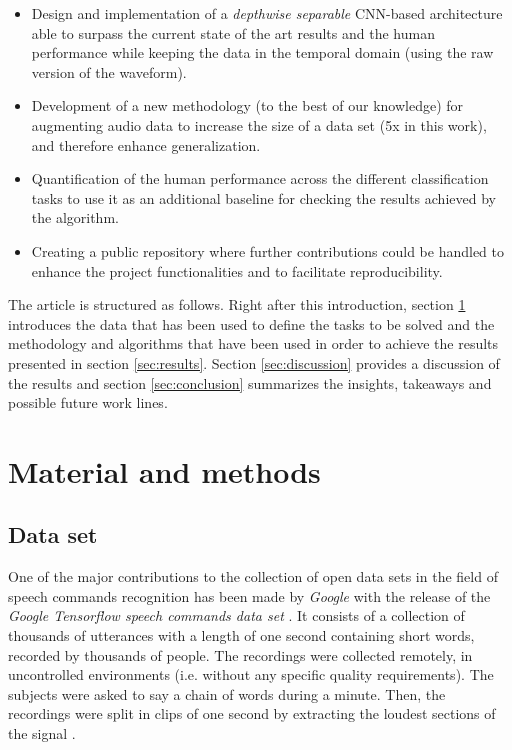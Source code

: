  \begin{itemize}
 	\item Design and implementation of a \textit{depthwise separable} CNN-based architecture able to surpass the current state of the art results and the human performance while keeping the data in the temporal domain (using the raw version of the waveform).
 	 	
 	\item Development of a new methodology (to the best of our knowledge) for augmenting audio data to increase the size of a data set (5x in this work), and therefore enhance generalization. 
 	
 	\item Quantification of the human performance across the different classification tasks to use it as an additional baseline for checking the results achieved by the algorithm.
 	
	\item Creating a public repository where further contributions could be handled to enhance the project functionalities and to facilitate reproducibility.
 \end{itemize}
 
 The article is structured as follows. Right after this introduction, section \ref{sec:MM} introduces the data that has been used to define the tasks to be solved and the methodology and algorithms that have been used in order to achieve the results presented in section \ref{sec:results}. Section \ref{sec:discussion} provides a discussion of the results and section \ref{sec:conclusion} summarizes the insights, takeaways and possible future work lines.
  
 \section{Material and methods} \label{sec:MM} 

\subsection{Data set}
One of the major contributions to the collection of open data sets in the field of speech commands recognition has been made by \textit{Google} with the release of the \textit{Google Tensorflow speech commands data set} \cite{speechcommands, Warden2018}. It consists of a collection of thousands of utterances with a length of one second containing short words, recorded by thousands of people. The recordings were collected remotely, in uncontrolled environments (i.e. without any specific quality requirements). The subjects were asked to say a chain of words during a minute. Then, the recordings were split in clips of one second by extracting the loudest sections of the signal \cite{speechcommands, Warden2018}.

